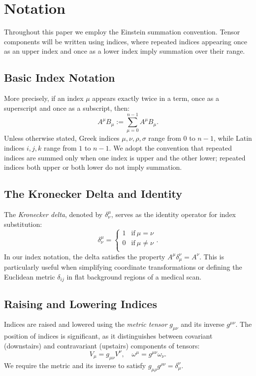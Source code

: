 \section{Notation}
\label{sec:notation}

Throughout this paper we employ the Einstein summation convention. Tensor components will be written using indices, where repeated indices appearing once as an upper index and once as a lower index imply summation over their range.

\subsection{Basic Index Notation} More precisely, if an index $\mu$ appears exactly twice in a term, once as a superscript and once as a subscript, then:
\[%
  A^\mu B_\mu := \sum_{\mu=0}^{n-1} A^\mu B_\mu
.\]%
Unless otherwise stated, Greek indices $\mu, \nu, \rho, \sigma$ range from $0$ to $n-1$, while Latin indices $i, j, k$ range from $1$ to $n-1$. We adopt the convention that repeated indices are summed only when one index is upper and the other lower; repeated indices both upper or both lower do not imply summation.

\subsection{The Kronecker Delta and Identity} The \emph{Kronecker delta}, denoted by $\delta^\mu_\nu$, serves as the identity operator for index substitution:
\[%
  \delta^\mu_\nu = \begin{cases}
    1 & \text{if}~\mu = \nu \\
    0 & \text{if}~\mu \neq \nu \\
  \end{cases}
.\]%
In our index notation, the delta satisfies the property $A^\mu \delta^\nu_\mu = A^\nu$. This is particularly useful when simplifying coordinate transformations or defining the Euclidean metric $\delta_{ij}$ in flat background regions of a medical scan.

\subsection{Raising and Lowering Indices} Indices are raised and lowered using the \emph{metric tensor} $g_{\mu\nu}$ and its inverse $g^{\mu\nu}$. The position of indices is significant, as it distinguishes between covariant (downstairs) and contravariant (upstairs) components of tensors:
\[%
  V_\mu = g_{\mu\nu} V^\nu, \quad \omega^\mu = g^{\mu\nu} \omega_\nu
.\]%
We require the metric and its inverse to satisfy $g_{\mu\rho}g^{\rho\nu} = \delta_\mu^\nu$.

